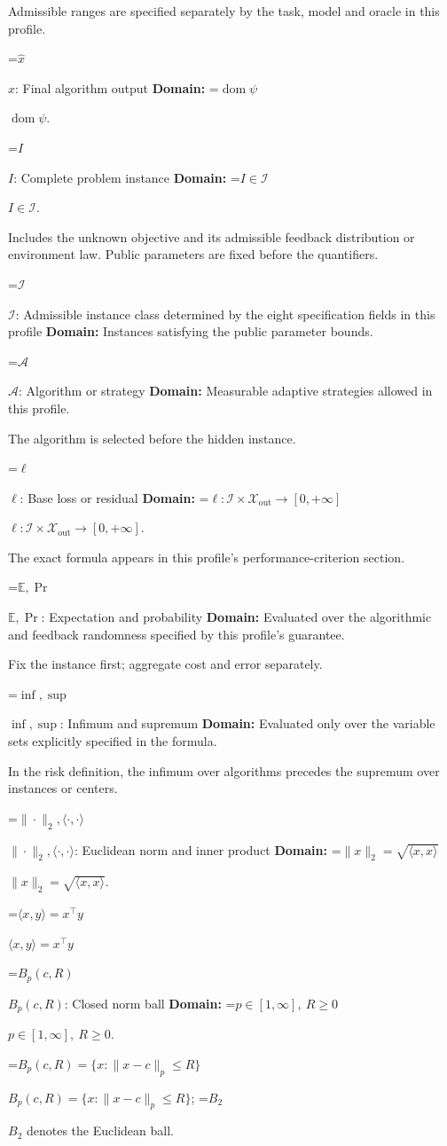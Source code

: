 \documentclass[10pt,a4paper]{article}
\newcommand{\AtlasMath}[1]{\par\begingroup\centering\setbox0=\hbox{$\displaystyle #1$}\ifdim\wd0>1.4\linewidth\typeout{ATLAS WIDE FORMULA: \the\wd0}\fi\ifdim\wd0>\linewidth\resizebox{\linewidth}{!}{\box0}\else\box0\fi\par\endgroup}
\newcommand{\AtlasInlineMath}[1]{\begingroup\setbox0=\hbox{$#1$}\ifdim\wd0>.4\linewidth\endgroup\AtlasMath{#1}\else\endgroup$#1$\fi}
\begin{document}
Admissible ranges are specified separately by the task, model and oracle in this profile.

\AtlasInlineMath{\widehat{x}}: Final algorithm output \textbf{Domain:} \AtlasInlineMath{\operatorname{dom}\psi}.

\AtlasInlineMath{I}: Complete problem instance \textbf{Domain:} \AtlasInlineMath{I\in\mathcal{I}}.

Includes the unknown objective and its admissible feedback distribution or environment law. Public parameters are fixed before the quantifiers.

\AtlasInlineMath{\mathcal{I}}: Admissible instance class determined by the eight specification fields in this profile \textbf{Domain:} Instances satisfying the public parameter bounds.

\AtlasInlineMath{\mathcal{A}}: Algorithm or strategy \textbf{Domain:} Measurable adaptive strategies allowed in this profile.

The algorithm is selected before the hidden instance.

\AtlasInlineMath{\ell}: Base loss or residual \textbf{Domain:} \AtlasInlineMath{\ell:\mathcal{I}\times\mathcal{X}_{\mathrm{out}}\to[0,+\infty]}.

The exact formula appears in this profile's performance-criterion section.

\AtlasInlineMath{\mathbb{E},\Pr}: Expectation and probability \textbf{Domain:} Evaluated over the algorithmic and feedback randomness specified by this profile's guarantee.

Fix the instance first; aggregate cost and error separately.

\AtlasInlineMath{\inf,\sup}: Infimum and supremum \textbf{Domain:} Evaluated only over the variable sets explicitly specified in the formula.

In the risk definition, the infimum over algorithms precedes the supremum over instances or centers.

\AtlasInlineMath{\|\cdot\|_2,\langle\cdot,\cdot\rangle}: Euclidean norm and inner product \textbf{Domain:} \AtlasInlineMath{\|x\|_2=\sqrt{\langle x,x\rangle}}.

\AtlasInlineMath{\langle x,y\rangle=x^\top y}

\AtlasInlineMath{B_p(c,R)}: Closed norm ball \textbf{Domain:} \AtlasInlineMath{p\in[1,\infty],\ R\ge0}.

\AtlasInlineMath{B_p(c,R)=\{x:\|x-c\|_p\le R\}}; \AtlasInlineMath{B_2} denotes the Euclidean ball.
\end{document}
